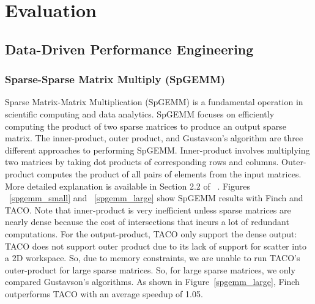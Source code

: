 
\section{Evaluation}

\subsection{Data-Driven Performance Engineering}
\subsubsection{Sparse-Sparse Matrix Multiply (SpGEMM)}

Sparse Matrix-Matrix Multiplication (SpGEMM) is a fundamental operation in scientific computing and data analytics. SpGEMM focuses on efficiently computing the product of two sparse matrices to produce an output sparse matrix.
The inner-product, outer product, and Gustavson's algorithm are three different approaches to performing SpGEMM. 
Inner-product involves multiplying two matrices by taking dot products of corresponding rows and columns.
Outer-product computes the product of all pairs of elements from the input matrices.
More detailed explanation is available in Section 2.2 of ~\cite{zhang2021gamma}.
Figures ~\ref{spgemm_small} and ~\ref{spgemm_large} show SpGEMM results with Finch and TACO.
Note that inner-product is very inefficient unless sparse matrices are nearly dense because the cost of intersections that incurs a lot of redundant computations. For the output-product, TACO only support the dense output: TACO does not support outer product due to its lack of support for scatter into a 2D workspace. So, due to memory constraints, we are unable to run TACO's outer-product for large sparse matrices. So, for large sparse matrices, we only compared Gustavson's algorithms. 
As shown in Figure~\ref{spgemm_large}, Finch outperforms TACO with an average speedup of 1.05.







